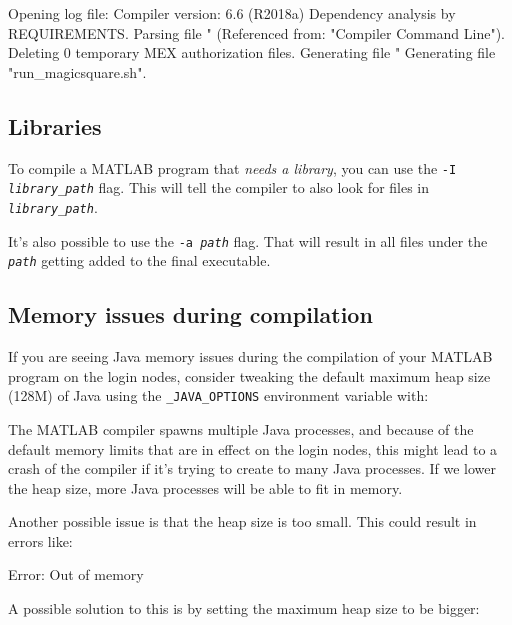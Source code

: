 \begin{prompt}
Opening log file:  %
Compiler version: 6.6 (R2018a)
Dependency analysis by REQUIREMENTS.
Parsing file "%
	(Referenced from: "Compiler Command Line").
Deleting 0 temporary MEX authorization files.
Generating file "%
Generating file "run\_magicsquare.sh".
\end{prompt}

\subsection{Libraries}

To compile a MATLAB program that \emph{needs a library}, you can use the
\texttt{-I \emph{library\_path}} flag. This will tell the compiler to also
look for files in \texttt{\emph{library\_path}}.

It's also possible to use the \texttt{-a \emph{path}} flag. That will result in
all files under the \texttt{\emph{path}} getting added to the final executable.

\subsection{Memory issues during compilation}

If you are seeing Java memory issues during the compilation of your MATLAB program
on the login nodes, consider tweaking the default maximum heap size (128M) of Java
using the \verb|_JAVA_OPTIONS| environment variable with:

\begin{prompt}
\end{prompt}

The MATLAB compiler spawns multiple Java processes, and because of the default memory
limits that are in effect on the login nodes, this might lead to a crash of the compiler
if it's trying to create to many Java processes. If we lower the heap size, more
Java processes will be able to fit in memory.

Another possible issue is that the heap size is too small. This could result
in errors like:

\begin{prompt}
Error: Out of memory
\end{prompt}

A possible solution to this is by setting the maximum heap size to be bigger:

